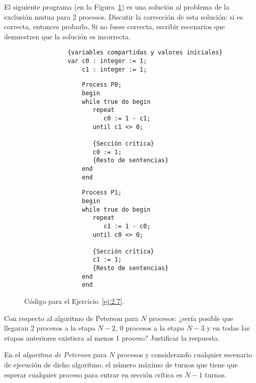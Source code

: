 \begin{ejercicio}\label{ej:2.7}
    El siguiente programa (en la Figura~\ref{fig:cod_7}) es una solución al problema de la exclusión mutua para 2 procesos.  Discutir la corrección de esta solución: si es correcta, entonces probarlo. Si no fuese correcta, escribir escenarios que demuestren que la solución es incorrecta.
    \begin{figure}
        \centering
        \begin{verbatim}
            {variables compartidas y valores iniciales}
            var c0 : integer := 1;
                c1 : integer := 1;
        \end{verbatim}
        \setlength{\columnsep}{1cm}
        \begin{multicols}{2}
            \begin{verbatim}
                Process P0;
                begin
                while true do begin
                   repeat 
                      c0 := 1 - c1;
                   until c1 <> 0;

                   {Sección crítica}
                   c0 := 1;
                   {Resto de sentencias}
                end
                end
            \end{verbatim}
            \begin{verbatim}
                Process P1;
                begin
                while true do begin
                   repeat 
                      c1 := 1 - c0;
                   until c0 <> 0;

                   {Sección crítica}
                   c1 := 1;
                   {Resto de sentencias}
                end
                end
            \end{verbatim}
        \end{multicols}
        \caption{Código para el Ejercicio~\ref{ej:2.7}.}
        \label{fig:cod_7}
    \end{figure}
\end{ejercicio}

\begin{ejercicio}
    Con respecto al algoritmo de Peterson para $N$ procesos: ¿sería posible que llegaran 2 procesos a la etapa $N-2$, 0 procesos a la etapa $N-3$ y en todas las etapas anteriores existiera al menos 1 proceso? Justificar la respuesta.
\end{ejercicio}

\begin{ejercicio}
    En el \textit{algoritmo de Peterson} para $N$ procesos y considerando cualquier escenario de ejecución de dicho algoritmo, el número máximo de turnos que tiene que esperar cualquier proceso para entrar en sección crítica es $N-1$ turnos.
\end{ejercicio}

